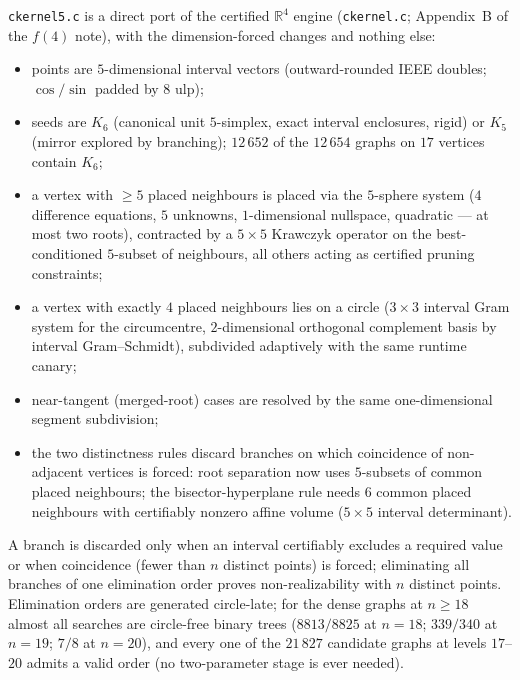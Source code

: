 \documentclass[11pt]{article}
\newcommand{\R}{\mathbb{R}}
\begin{document}
\texttt{ckernel5.c} is a direct port of the certified $\R^4$ engine
(\texttt{ckernel.c}; Appendix~B of the $f(4)$ note), with the
dimension-forced changes and nothing else:
\begin{itemize}
\item points are $5$-dimensional interval vectors (outward-rounded IEEE
      doubles; $\cos/\sin$ padded by $8$ ulp);
\item seeds are $K_6$ (canonical unit $5$-simplex, exact interval
      enclosures, rigid) or $K_5$ (mirror explored by branching);
      $12\,652$ of the $12\,654$ graphs on $17$ vertices contain $K_6$;
\item a vertex with $\ge5$ placed neighbours is placed via the
      $5$-sphere system ($4$ difference equations, $5$ unknowns,
      $1$-dimensional nullspace, quadratic --- at most two roots),
      contracted by a $5{\times}5$ Krawczyk operator on the
      best-conditioned $5$-subset of neighbours, all others acting as
      certified pruning constraints;
\item a vertex with exactly $4$ placed neighbours lies on a circle
      ($3{\times}3$ interval Gram system for the circumcentre,
      $2$-dimensional orthogonal complement basis by interval
      Gram--Schmidt), subdivided adaptively with the same runtime canary;
\item near-tangent (merged-root) cases are resolved by the same
      one-dimensional segment subdivision;
\item the two distinctness rules discard branches on which coincidence of
      non-adjacent vertices is forced: root separation now uses
      $5$-subsets of common placed neighbours; the bisector-hyperplane
      rule needs $6$ common placed neighbours with certifiably nonzero
      affine volume ($5{\times}5$ interval determinant).
\end{itemize}
A branch is discarded only when an interval certifiably excludes a
required value or when coincidence (fewer than $n$ distinct points) is
forced; eliminating all branches of one elimination order proves
non-realizability with $n$ distinct points. Elimination orders are
generated circle-late; for the dense graphs at $n\ge18$ almost all
searches are circle-free binary trees ($8813/8825$ at $n=18$; $339/340$ at
$n=19$; $7/8$ at $n=20$), and every one of the $21\,827$ candidate graphs
at levels $17$--$20$ admits a valid order (no two-parameter stage is ever
needed).
\end{document}
